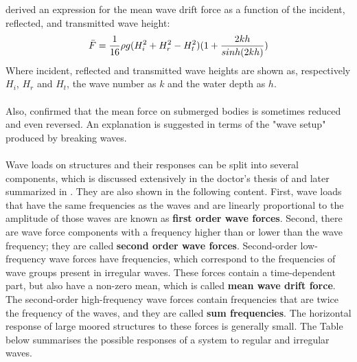 \citep{longuethiggins1977} derived an expression for the mean wave drift force as a function of the incident, reflected, and transmitted wave height:
\begin{equation}
    \Bar{F} = \frac{1}{16}\rho g (H_i^2 + H_r^2 - H_t^2)(1 + \frac{2kh}{sinh(2kh)})
    \label{eq: longuethiggins force}
\end{equation}
Where incident, reflected and transmitted wave heights are shown as, respectively $H_i$, $H_r$ and $H_t$, the wave number as $k$ and the water depth as $h$.\\
\\
Also, \citep{longuethiggins1977} confirmed that the mean force on submerged bodies is sometimes reduced and even reversed. An explanation is suggested in terms of the "wave setup" produced by breaking waves.\\
\\

Wave loads on structures and their responses can be split into several components, which is discussed extensively in the doctor's thesis of \citep{Pinkster1980} and later summarized in \citep{journee2000offshore}. They are also shown in the following content.
First, wave loads that have the same frequencies as the waves and are linearly proportional to the amplitude of those waves are known as \textbf{first order wave forces}. Second, there are wave force components with a frequency higher than or lower than the wave frequency; they are called \textbf{second order wave forces}. 
Second-order low-frequency wave forces have frequencies, which correspond to the frequencies of wave groups present in irregular waves. These forces contain a time-dependent part, but also have a non-zero mean, which is called \textbf{mean wave drift force}.
The second-order high-frequency wave forces contain frequencies that are twice the frequency of the waves, and they are called \textbf{sum frequencies}. The horizontal response of large moored structures to these forces is generally small. The Table below summarises the possible responses of a system to regular and irregular waves. 


